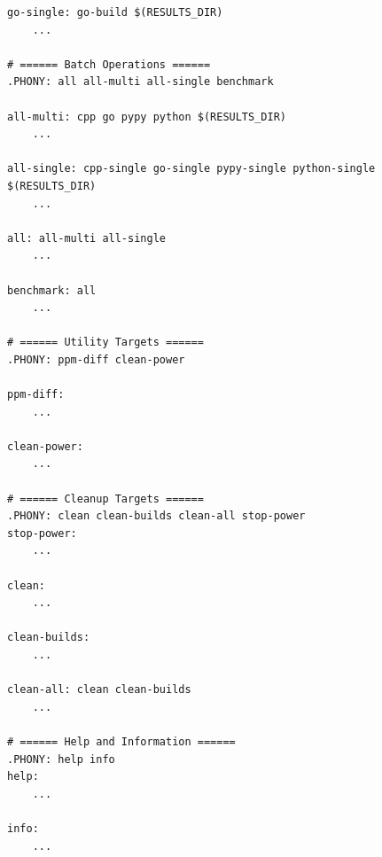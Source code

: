 \begin{lstlisting}[caption={Makefile for running the program.}, label={lst:makefile_run}]
go-single: go-build $(RESULTS_DIR)
	...
    
# ====== Batch Operations ======
.PHONY: all all-multi all-single benchmark

all-multi: cpp go pypy python $(RESULTS_DIR)
	...

all-single: cpp-single go-single pypy-single python-single $(RESULTS_DIR)
	...

all: all-multi all-single
	...

benchmark: all
	...

# ====== Utility Targets ======
.PHONY: ppm-diff clean-power

ppm-diff:
	...

clean-power:
	...

# ====== Cleanup Targets ======
.PHONY: clean clean-builds clean-all stop-power
stop-power:
	...

clean:
	...

clean-builds:
	...

clean-all: clean clean-builds
	...

# ====== Help and Information ======
.PHONY: help info
help:
	...

info:
	...
\end{lstlisting}
